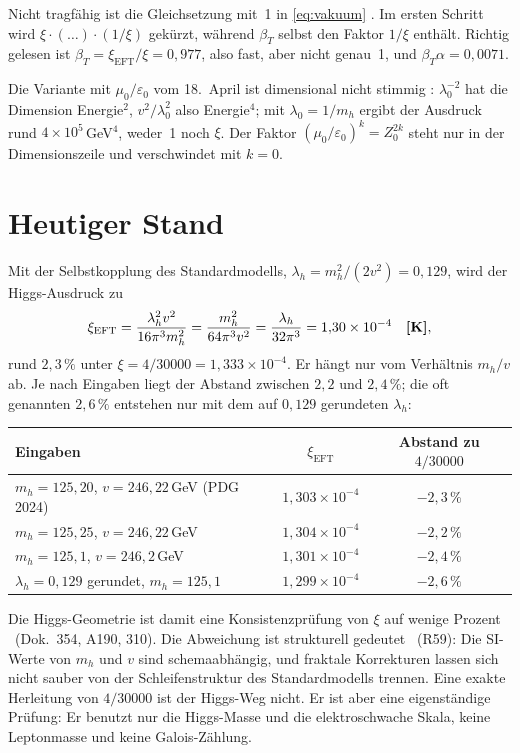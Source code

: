 Nicht tragfähig ist die Gleichsetzung mit~1 in \eqref{eq:vakuum} \XM. Im ersten Schritt wird
$\xi\cdot(\ldots)\cdot(1/\xi)$ gekürzt, während $\beta_T$ selbst den Faktor $1/\xi$ enthält.
Richtig gelesen ist $\beta_T=\xi_{\text{EFT}}/\xi=0{,}977$, also fast, aber nicht genau~1, und
$\beta_T\alpha=0{,}0071$.

Die Variante mit $\mu_0/\varepsilon_0$ vom 18.~April ist dimensional nicht stimmig \XM:
$\lambda_0^{-2}$ hat die Dimension Energie$^2$, $v^2/\lambda_0^2$ also Energie$^4$; mit
$\lambda_0=1/m_h$ ergibt der Ausdruck rund $4\times10^5$\,GeV$^4$, weder~1 noch $\xi$. Der Faktor
$(\mu_0/\varepsilon_0)^k=Z_0^{2k}$ steht nur in der Dimensionszeile und verschwindet mit $k=0$.

\section{Heutiger Stand}

Mit der Selbstkopplung des Standardmodells, $\lambda_h=m_h^2/(2v^2)=0{,}129$, wird der
Higgs-Ausdruck zu
\begin{equation}
  \xi_{\text{EFT}}=\frac{\lambda_h^2v^2}{16\pi^3m_h^2}=\frac{m_h^2}{64\pi^3v^2}
  =\frac{\lambda_h}{32\pi^3}=1{,}30\times10^{-4}\quad\textbf{[K]} ,
\end{equation}
rund $2{,}3\,\%$ unter $\xi=4/30000=1{,}333\times10^{-4}$. Er hängt nur vom Verhältnis $m_h/v$ ab.
Je nach Eingaben liegt der Abstand zwischen $2{,}2$ und $2{,}4\,\%$; die oft genannten $2{,}6\,\%$
entstehen nur mit dem auf $0{,}129$ gerundeten $\lambda_h$:
\begin{center}
\small
\begin{tabular}{@{}lcc@{}}
\toprule
\textbf{Eingaben} & $\xi_{\text{EFT}}$ & \textbf{Abstand zu }$4/30000$ \\
\midrule
$m_h=125{,}20$, $v=246{,}22$\,GeV (PDG 2024) & $1{,}303\times10^{-4}$ & $-2{,}3\,\%$ \\
$m_h=125{,}25$, $v=246{,}22$\,GeV & $1{,}304\times10^{-4}$ & $-2{,}2\,\%$ \\
$m_h=125{,}1$, $v=246{,}2$\,GeV & $1{,}301\times10^{-4}$ & $-2{,}4\,\%$ \\
$\lambda_h=0{,}129$ gerundet, $m_h=125{,}1$ & $1{,}299\times10^{-4}$ & $-2{,}6\,\%$ \\
\bottomrule
\end{tabular}
\end{center}
Die Higgs-Geometrie ist damit eine Konsistenzprüfung von $\xi$ auf wenige Prozent \KM\
(Dok.~354, A190, 310). Die Abweichung ist strukturell gedeutet \SM\ (R59): Die SI-Werte von $m_h$
und $v$ sind schemaabhängig, und fraktale Korrekturen lassen sich nicht sauber von der
Schleifenstruktur des Standardmodells trennen. Eine exakte Herleitung von $4/30000$ ist der
Higgs-Weg nicht. Er ist aber eine eigenständige Prüfung: Er benutzt nur die Higgs-Masse und die
elektroschwache Skala, keine Leptonmasse und keine Galois-Zählung.

